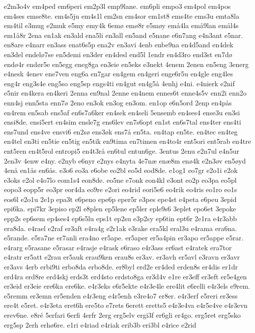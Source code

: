 {e2m3o4v
em4ped
em6peri
em2p3l
emp9lane.
em6pli
empo3
em4pol
em4pos
em4ses
emse8te.
em4s5ju
em4s1l
em2sn
em4sor
em1st8
ems4te
ems3u
emta8la
em4til
e3mug
e2muk
e5my
emy4k
6emø
emø8r
e5møy
emå4la
emå9lan
emål4s
em1å8r
2ena
en1ak
en3ald
ena5li
en3all
en5and
e5nane
e6n7ang
e4n3ant
e5nar.
en8are
e4narr
en3ass
enat6s5p
ena2v
en3avi
4enb
enbe9na
en4d5and
en4dek
en3del
endelø7se
en5demi
en3der
en4desl
end5l
1endr
en4d3ro
end3st
en7dø
endø4r
endør5e
en5egg
eneg8ga
en3eie
en5eks
e3nekt
4enem
2enen
en5eng
3energ
e4nesk
4enev
ene7ven
eng6a
en7gar
en4gem
en4geri
enge6r5u
en4gle
eng4les
eng4r
eng3s4e
eng5so
eng5sp
engs4ti
en4gut
en4g5å
4enhj
e4ni.
e4nierk
e2nif
e5nir
en4kera
en4keri
2enna
en9nal
2enne
en4nem
ennes6t
enne4s5v
enn2i
enn2o
enn4sj
enn5sta
enn7ø
2eno
en3ok
en3og
en3om.
en1op
e6n5ord
2enp
en4pås
en4rem
en5sab
ens5af
en6s7a6ker
en4sek
en4seli
5ensemb
en4ses4
ense3u
en3si
ensi8de.
ensi5ert
en4sim
ensle7g
ens6lev
en7s6opt
en1st
en6s7tal
ens4ter
ens4ti
ens7und
ens4ve
ensvi6
en2sø
ens3øk
ens7å
en5ta.
en4tap
en5te.
en4tec
en4teg
en4tel
en3ti
en5tie
en5tig
en5tik
en9tima
en7timen
en4to4r
ent5ori
ent5rab
en4tre
ent5ren
en4t5rol
entropi5
en4t3rå
en6tul
entun6ge.
3entus
2enu
e2n7ul
e4n5ur
2en3v
4enw
e4ny.
e2nyb
e6nyr
e2nys
e4nyta
4e7næ
enæ8m
enø4k
e2n3øv
en5øyd
4enå
en1ås
en6ås.
e3o6
eo3a
e6obe
eo2bl
eo5d
eod8de.
e1og1
eo7gr
e2o1i
e2ok
e3oks
e2ol
e4o7lo
eom1s4
eon8de.
eo5ne
e7onk
eon4kl
e3ont
eo2p
eo3pa
eo5pl
eopo3
eopp5r
eo3pr
eor4da
eo9re
e2ori
eo4rid
eori5e6
eo4rik
eo4ris
eo1ro
eo1s
eos6l
e2o1u
2e1p
epa3t
e6peno
epe6p
eper5r
e3pes
epe4st
e4peta
e6peu
3epid
epi6ka.
epi7kr
3episo
ep2l
e8plen
ep5lene
ep5ler
eple9s6
3eplet
epo6et
3epoke
epp2s
ep6sem
ep4ses4
ep6s5lu
eps1t
ep2su
e3p2sy
ep6tin
ept6r
2e1ra
e4r3abb
era8da.
e4rael
e2raf
er3aft
e4ra4g
e2r1ak
e3rake
era5kl
eral3u
e4rama
era6na.
e5rande.
e5ra7ne
er7anli
era4no
er5ape.
er5aper
er5a4pin
er3apo
er5appe
e5rar.
e4rarg
e5rasane
e5rasar
e4rasje
e4rask
e6raso
e4r3ass
er6ast
e4ratek
era7tor
e4ratr
er5att
e2rau
er5auk
erau9ken
erau8s
er3av.
er3avh
er5avl
e3ravn
er3avr
er3avs
4erb
erbi9ti
erbo8da
erbo8de.
er8byl
erd2e
er4ded
erden8s
er4dis
er1dr
erd4ra
erd8re
erd4skj
erds3t
erd4sto
erdsto8ga
er3d4v
e1re
er3eff
er3eft
er5e4gen
er3eid
er3eie
ere6ka
ere6ke.
e4r3eks
e6r5ekte
e4r3e4le
ere4lit
e6relli
e4r3els
e9rem.
e5remm
er3emn
er5enden
e4r3eng
e4r5enh
e3re4o7
er8er.
e4r3erf
e5reri
er3ess
ere4t
e5ret.
e4r3eta
eret6h
ere5to
e7rets
6erett
eretts5
e4r3e4va
e4r5e4ve
e4r3evn
erev6ne.
e8ré
5erfari
6erfi
4erfr
2erg
erg5elv
ergi3f
er6gli
er4go.
erg5ret
erg5sko
erg5sp
2erh
erhø6re.
e1ri
e4riad
e4riak
erib3b
eri3bl
e4rice
e2rid
}
